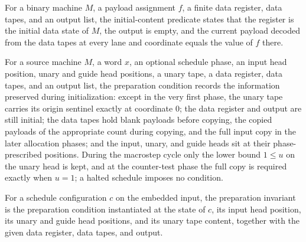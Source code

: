 \begin{definition}
\label{Complexity.initialContent}
\leanok
{}
For a binary machine $M$, a payload assignment $f$, a finite data register, data
tapes, and an output list, the initial-content predicate states that the
register is the initial data state of $M$, the output is empty, and the current
payload decoded from the data tapes at every lane and coordinate equals the
value of $f$ there.
\end{definition}

\begin{definition}
\label{Complexity.prepCondition}
\leanok
{}
For a source machine $M$, a word $x$, an optional schedule phase, an input head
position, unary and guide head positions, a unary tape, a data register, data
tapes, and an output list, the preparation condition records the information
preserved during initialization: except in the very first phase, the unary tape
carries its origin sentinel exactly at coordinate $0$; the data register and
output are still initial; the data tapes hold blank payloads before copying, the
copied payloads of the appropriate count during copying, and the full input copy
in the later allocation phases; and the input, unary, and guide heads sit at
their phase-prescribed positions.  During the macrostep cycle only the lower
bound $1 \le u$ on the unary head is kept, and at the counter-test phase the
full copy is required exactly when $u = 1$; a halted schedule imposes no
condition.
\end{definition}

\begin{definition}
\label{Complexity.prepInvariant}
\leanok
{}
For a schedule configuration $c$ on the embedded input, the preparation
invariant is the preparation condition instantiated at the state of $c$, its
input head position, its unary and guide head positions, and its unary tape
content, together with the given data register, data tapes, and output.
\end{definition}

